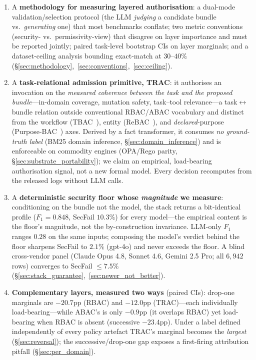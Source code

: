 \documentclass[sigconf,review,anonymous]{acmart}
\begin{document}
\begin{enumerate}
  \item A \textbf{methodology for measuring layered authorisation}: a dual-mode validation/selection protocol (the LLM \emph{judging} a candidate bundle vs.\ \emph{generating} one) that most benchmarks conflate; two metric conventions (security- vs.\ permissivity-view) that disagree on layer importance and must be reported jointly; paired task-level bootstrap CIs on layer marginals; and a dataset-ceiling analysis bounding exact-match at $30$--$40\%$ (\S\ref{sec:methodology},~\ref{sec:conventions},~\ref{sec:ceiling}).

  \item A \textbf{task-relational admission primitive, TRAC}: it authorises an invocation on the \emph{measured coherence between the task and the proposed bundle}---in-domain coverage, mutation safety, task--tool relevance---a task$\leftrightarrow$bundle relation outside conventional RBAC/ABAC vocabulary and distinct from the workflow (TBAC~\cite{thomas1997tbac}), entity (ReBAC~\cite{fong2011rebac}), and \emph{declared}-purpose (Purpose-BAC~\cite{byun2005purpose}) axes. Derived by a fact transformer, it consumes \emph{no ground-truth label} (BM25 domain inference, \S\ref{sec:domain_inference}) and is enforceable on commodity engines (OPA/Rego parity, \S\ref{sec:substrate_portability}); we claim an empirical, load-bearing authorisation signal, not a new formal model. Every decision recomputes from the released logs without LLM calls.

  \item A \textbf{deterministic security floor whose \emph{magnitude} we measure}: conditioning on the bundle not the model, the stack returns a bit-identical profile ($F_1\!=\!0.848$, SecFail $10.3\%$) for every model---the empirical content is the floor's magnitude, not the by-construction invariance. LLM-only $F_1$ ranges $0.28$ on the same inputs; composing the model's verdict behind the floor sharpens SecFail to $2.1\%$ (gpt-4o) and never exceeds the floor. A blind cross-vendor panel (Claude Opus 4.8, Sonnet 4.6, Gemini 2.5 Pro; all $6{,}942$ rows) converges to SecFail $\leq\!7.5\%$ (\S\ref{sec:stack_guarantee},~\ref{sec:newer_not_better}).

  \item \textbf{Complementary layers, measured two ways} (paired CIs): drop-one marginals are $-20.7$pp (RBAC) and $-12.0$pp (TRAC)---each individually load-bearing---while ABAC's is only $-0.9$pp (it overlaps RBAC) yet load-bearing when RBAC is absent (successive $-23.4$pp). Under a label defined independently of every policy artefact TRAC's marginal becomes the \emph{largest} (\S\ref{sec:reversal}); the successive/drop-one gap exposes a first-firing attribution pitfall (\S\ref{sec:per_domain}).


\end{enumerate}
\end{document}
